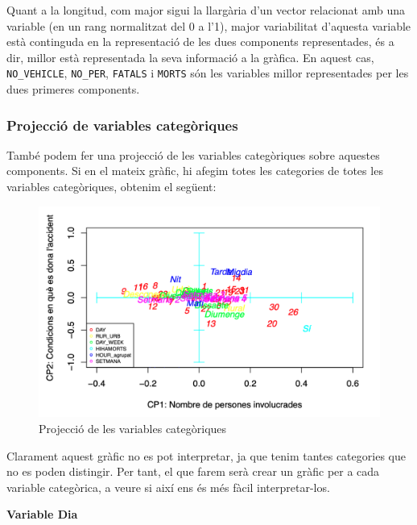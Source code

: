 \documentclass[11pt,longbibliography]{article}
\theoremstyle{definition}
\theoremstyle{remark}
\begin{document}
Quant a la longitud, com major sigui la llargària d'un vector relacionat amb una variable (en un rang normalitzat del 0 a l'1), major variabilitat d'aquesta variable està continguda en la representació de les dues components representades, és a dir, millor està representada la seva informació a la gràfica. En aquest cas, \texttt{NO\_VEHICLE}, \texttt{NO\_PER}, \texttt{FATALS} i \texttt{MORTS} són les variables millor representades per les dues primeres components.


\subsubsection{Projecció de variables categòriques}


També podem fer una projecció de les variables categòriques sobre aquestes components. Si en el mateix gràfic, hi afegim totes les categories de totes les variables categòriques, obtenim el següent:

\begin{figure}[H]
\begin{center}
\includegraphics[width=12cm]{acp6}
\end{center}
\caption{Projecció de les variables categòriques}
\label{fig:ACP6}
\end{figure}


Clarament aquest gràfic no es pot interpretar, ja que tenim tantes categories que no es poden distingir.
Per tant, el que farem serà crear un gràfic per a cada variable categòrica, a veure si així ens és més fàcil interpretar-los.



\textbf{Variable Dia}
\end{document}
